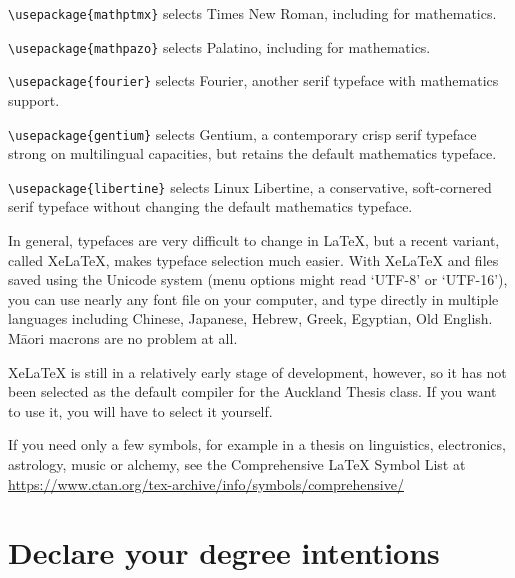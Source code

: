 \begin{description}
\item {\verb+\usepackage{mathptmx}+} selects Times New Roman, including for mathematics.

\item {\verb+\usepackage{mathpazo}+} selects Palatino, including for mathematics.

\item {\verb+\usepackage{fourier}+} selects Fourier, another serif typeface with mathematics support.

\item {\verb+\usepackage{gentium}+} selects Gentium, a contemporary crisp serif typeface strong on multilingual capacities, but retains the default mathematics typeface.

\item {\verb+\usepackage{libertine}+} selects Linux Libertine, a conservative, soft-cornered serif typeface without changing the default mathematics typeface.

\end{description}

In general, typefaces are very difficult to change in LaTeX, but a recent variant, called XeLaTeX, makes typeface selection much easier. With XeLaTeX and files saved using the Unicode system (menu options might read `UTF-8' or `UTF-16'), you can use nearly any font file on your computer, and type directly in multiple languages including Chinese, Japanese, Hebrew, Greek, Egyptian, Old English. M\=aori macrons are no problem at all.

XeLaTeX is still in a relatively early stage of development, however, so it has not been selected as the default compiler for the Auckland Thesis class. If you want to use it, you will have to select it yourself.

If you need only a few symbols, for example in a thesis on linguistics, electronics, astrology, music or alchemy, see the Comprehensive LaTeX Symbol List at \url{https://www.ctan.org/tex-archive/info/symbols/comprehensive/}


\section{Declare your degree intentions}

